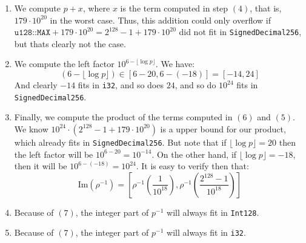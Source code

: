 \documentclass[11pt]{article}
\begin{document}
\begin{enumerate}[label=(\arabic*).]
    \item We compute $p + x$, where $x$ is the term computed in step $(4)$,
        that is, $179\cdot 10^{20}$ in the worst case. Thus, this addition
        could only overflow if $\texttt{u128::MAX} + 179\cdot 10^{20} = 2^{128}
        - 1 + 179\cdot 10^{20}$ did not fit in \texttt{SignedDecimal256}, but
        thats clearly not the case.
    \item We compute the left factor $10^{6-\lfloor\log p\rfloor}$. We have:
        $$
	        (6 - \lfloor\log p\rfloor) \in [6 - 20, 6 -(-18)] =[-14, 24]
        $$
        And clearly $-14$ fits in \texttt{i32}, and so does $24$, and so do
        $10^{24}$ fits in \texttt{SignedDecimal256}.
    \item Finally, we compute the product of the terms computed in $(6)$ and $(5)$.
        We know $10^{24}\cdot (2^{128} - 1+179\cdot 10^{20})$
        is a upper bound for our product, which already fits in \texttt{SignedDecimal256}. But note that if 
        $\lfloor\log p\rfloor = 20$ then the left factor will be $10^{6-20} = 10^{-14}$.
        On the other hand, if $\lfloor\log p\rfloor = -18$, then it will be $10^{6-(-18)}=10^{24}$.
        It is easy to verify then that:
        \[
            \text{Im}(\rho^{-1}) = \left[ \rho^{-1}\left(\frac 1{10^{18}}\right),
            \rho^{-1}\left(\frac{2^{128}-1}{10^{18}}\right) \right]
        \]
    \item Because of $(7)$, the integer part of $p^{-1}$ will always fit in
        \texttt{Int128}.
    \item Because of $(7)$, the integer part of $p^{-1}$ will always fit in
        \texttt{i32}.
\end{enumerate}


\break


\end{document}
